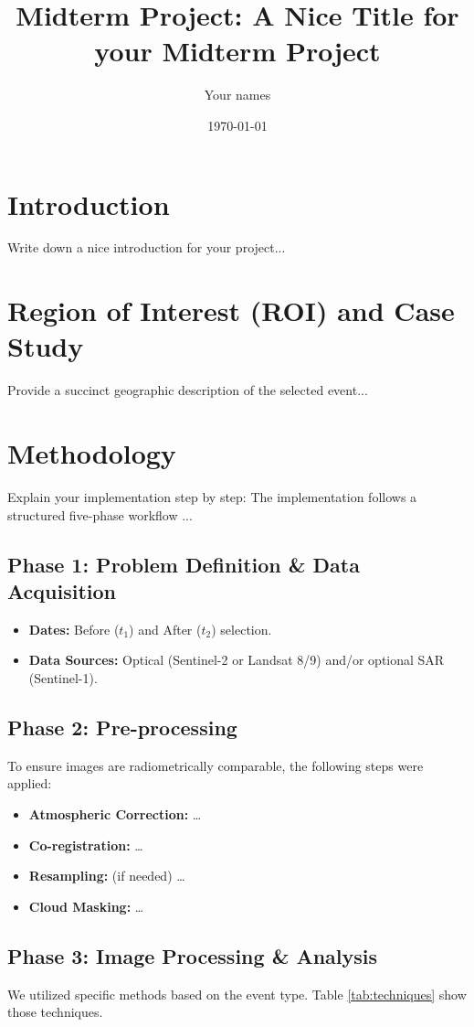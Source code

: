 \documentclass[12pt]{article}
\title{Midterm Project: A Nice Title for your Midterm Project}
\author{Your names}
\date{\today}
\begin{document}
\maketitle

\section{Introduction}
Write down a nice introduction for your project...

\section{Region of Interest (ROI) and Case Study}
Provide a succinct geographic description of the selected event...

\section{Methodology}
Explain your implementation step by step:  The implementation follows a structured five-phase workflow \parencite{Lillesand2015}...

\subsection{Phase 1: Problem Definition \& Data Acquisition}
\begin{itemize}
    \item \textbf{Dates:} Before ($t_1$) and After ($t_2$) selection.
    \item \textbf{Data Sources:} Optical (Sentinel-2 or Landsat 8/9) and/or optional SAR (Sentinel-1).
\end{itemize}

\subsection{Phase 2: Pre-processing}
To ensure images are radiometrically comparable, the following steps were applied:
\begin{itemize}
    \item \textbf{Atmospheric Correction:} \ldots
    \item \textbf{Co-registration:} \ldots
    \item \textbf{Resampling:}  (if needed) \ldots
    \item \textbf{Cloud Masking:} \ldots
\end{itemize}

\subsection{Phase 3: Image Processing \& Analysis}
We utilized specific methods based on the event type.  Table \ref{tab:techniques} show those techniques.
\end{document}
